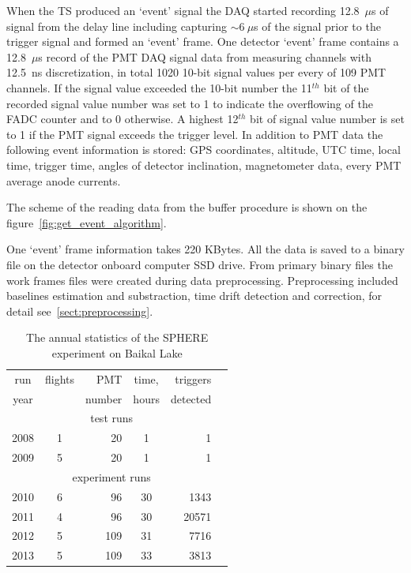 \documentclass[final,5p,times,twocolumn]{elsarticle}
\begin{document}
When the TS produced an `event' signal the DAQ started recording 12.8~$\mu$s of signal from the delay line including capturing $\sim 6~\mu$s of the signal prior to the trigger signal and formed an `event' frame. One detector `event' frame contains a 12.8~$\mu$s record of the PMT DAQ signal data from measuring channels with 12.5~ns discretization, in total 1020 10-bit signal values per every of 109 PMT channels. If the signal value exceeded the 10-bit number the 11$^{th}$ bit of the recorded signal value number was set to 1 to indicate the overflowing of the FADC counter and to 0 otherwise. A highest 12$^{th}$ bit of signal value number is set to 1 if the PMT signal exceeds the trigger level. In addition to PMT data the following event information is stored: GPS  coordinates, altitude, UTC time, local time, trigger time, angles of detector inclination, magnetometer data, every PMT average anode currents. 

The scheme of the reading data from the buffer procedure is shown on the figure~\ref{fig:get_event_algorithm}.

One `event' frame information takes 220 KBytes. All the data is saved to a binary file on the detector onboard computer SSD drive. From primary binary files the work frames files were created during data preprocessing. Preprocessing included baselines estimation and substraction, time drift detection and correction, for detail see~\ref{sect:preprocessing}.


\begin{table}[b]
\centering
\caption{The annual statistics of the SPHERE experiment on Baikal Lake}
\label{tab:statistics}
\vspace{1pc}
\begin{tabular}{|c||c|r|c|r|r|}
\hline
run  & flights & PMT    & time, & triggers \\ 
year &         & number & hours & detected \\ 
\hline \hline
\multicolumn{5}{|c|}{test runs} \\
\hline
2008 & 1 &  20 &  1 &     1 \\ 
2009 & 5 &  20 &  1 &     1 \\ 
\hline
\multicolumn{5}{|c|}{experiment runs} \\
\hline
2010 & 6 &  96 & 30 &  1343 \\
2011 & 4 &  96 & 30 & 20571 \\
2012 & 5 & 109 & 31 &  7716 \\
2013 & 5 & 109 & 33 &  3813 \\
\hline
\end{tabular}
\end{table}
\end{document}
